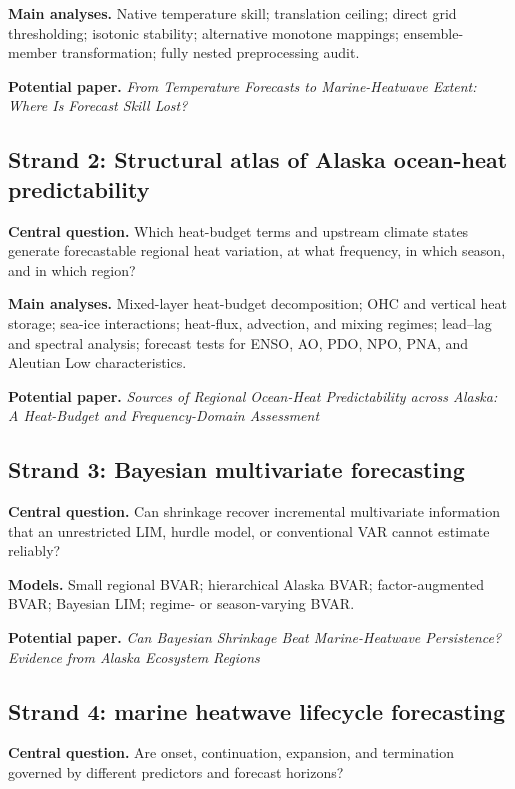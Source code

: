 \documentclass[11pt]{article}
\newcommand{\MHW}{marine heatwave}
\begin{document}
\textbf{Main analyses.} Native temperature skill; translation ceiling; direct grid thresholding; isotonic stability; alternative monotone mappings; ensemble-member transformation; fully nested preprocessing audit.

\textbf{Potential paper.} \emph{From Temperature Forecasts to Marine-Heatwave Extent: Where Is Forecast Skill Lost?}

\subsection{Strand 2: Structural atlas of Alaska ocean-heat predictability}

\textbf{Central question.} Which heat-budget terms and upstream climate states generate forecastable regional heat variation, at what frequency, in which season, and in which region?

\textbf{Main analyses.} Mixed-layer heat-budget decomposition; OHC and vertical heat storage; sea-ice interactions; heat-flux, advection, and mixing regimes; lead--lag and spectral analysis; forecast tests for ENSO, AO, PDO, NPO, PNA, and Aleutian Low characteristics.

\textbf{Potential paper.} \emph{Sources of Regional Ocean-Heat Predictability across Alaska: A Heat-Budget and Frequency-Domain Assessment}

\subsection{Strand 3: Bayesian multivariate forecasting}

\textbf{Central question.} Can shrinkage recover incremental multivariate information that an unrestricted LIM, hurdle model, or conventional VAR cannot estimate reliably?

\textbf{Models.} Small regional BVAR; hierarchical Alaska BVAR; factor-augmented BVAR; Bayesian LIM; regime- or season-varying BVAR.

\textbf{Potential paper.} \emph{Can Bayesian Shrinkage Beat Marine-Heatwave Persistence? Evidence from Alaska Ecosystem Regions}

\subsection{Strand 4: \MHW{} lifecycle forecasting}

\textbf{Central question.} Are onset, continuation, expansion, and termination governed by different predictors and forecast horizons?
\end{document}
